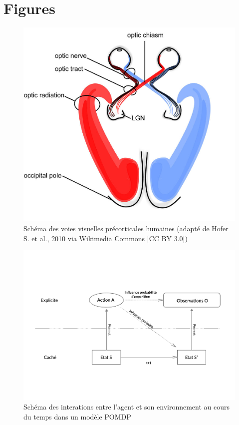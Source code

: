 
\chapter{Figures} %

\label{Figures} %

\begin{figure}[th]
\centering
\includegraphics{Figures/visual_system}
\decoRule %
\caption[Figure]{Schéma des voies visuelles précorticales humaines (adapté de Hofer S. et al., 2010 via Wikimedia Commons [CC BY 3.0])}
\label{fig:visual_system}
\end{figure}

\begin{figure}[th]
\centering
\includegraphics[scale=0.45]{Figures/POMDP}
\decoRule %
\caption[Figure]{Schéma des interations entre l'agent et son environnement au cours du temps dans un modèle POMDP}
\label{fig:POMDP}
\end{figure}

